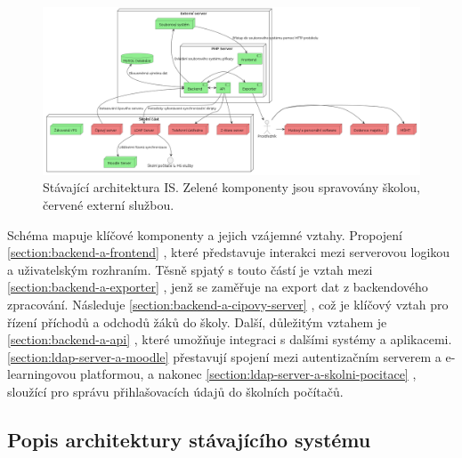 \documentclass[FM,Proj]{tulthesis}
\begin{document}
\begin{landscape}
    \begin{figure}[H]
        \includegraphics[width=\linewidth]{architektura-puvodni.png}
        \caption{Stávající architektura IS. Zelené komponenty jsou
        spravovány školou, červené externí službou.}
        \label{fig:puvodni-architektura}
    \end{figure}
\end{landscape}

Schéma mapuje klíčové komponenty a jejich vzájemné vztahy. Propojení \ref{section:backend-a-frontend}
, které představuje interakci mezi serverovou logikou a uživatelským
rozhraním. Těsně spjatý s touto částí je vztah mezi \ref{section:backend-a-exporter} 
, jenž se zaměřuje na export dat z backendového zpracování. 
Následuje \ref{section:backend-a-cipovy-server} , což je klíčový 
vztah pro řízení příchodů a odchodů žáků do školy. Další, důležitým vztahem je \ref{section:backend-a-api} 
, které umožňuje integraci s dalšími systémy a aplikacemi. 
\ref{section:ldap-server-a-moodle}  přestavují spojení mezi 
autentizačním serverem a e-learningovou platformou, a nakonec \ref{section:ldap-server-a-skolni-pocitace} 
, sloužící pro správu přihlašovacích údajů do školních počítačů.




\subsection*{Popis architektury stávajícího systému}
\end{document}
